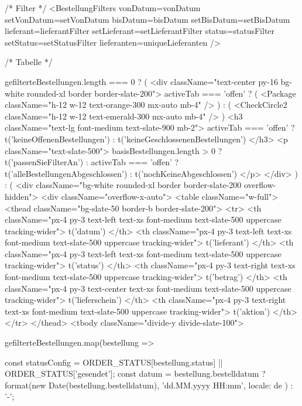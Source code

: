 {      {/* Filter */}
      <BestellungFilters
        vonDatum={vonDatum}
        setVonDatum={setVonDatum}
        bisDatum={bisDatum}
        setBisDatum={setBisDatum}
        lieferant={lieferantFilter}
        setLieferant={setLieferantFilter}
        status={statusFilter}
        setStatus={setStatusFilter}
        lieferanten={uniqueLieferanten}
      />

      {/* Tabelle */}
      {gefilterteBestellungen.length === 0 ? (
        <div className="text-center py-16 bg-white rounded-xl border border-slate-200">
          {activeTab === 'offen' ? (
            <Package className="h-12 w-12 text-orange-300 mx-auto mb-4" />
          ) : (
            <CheckCircle2 className="h-12 w-12 text-emerald-300 mx-auto mb-4" />
          )}
          <h3 className="text-lg font-medium text-slate-900 mb-2">
            {activeTab === 'offen' 
              ? t('keineOffenenBestellungen') 
              : t('keineGeschlossenenBestellungen')}
          </h3>
          <p className="text-slate-500">
            {basisBestellungen.length > 0 
              ? t('passenSieFilterAn')
              : activeTab === 'offen' 
                ? t('alleBestellungenAbgeschlossen')
                : t('nochKeineAbgeschlossen')}
          </p>
        </div>
      ) : (
        <div className="bg-white rounded-xl border border-slate-200 overflow-hidden">
          <div className="overflow-x-auto">
            <table className="w-full">
              <thead className="bg-slate-50 border-b border-slate-200">
                <tr>
                  <th className="px-4 py-3 text-left text-xs font-medium text-slate-500 uppercase tracking-wider">
                    {t('datum')}
                  </th>
                  <th className="px-4 py-3 text-left text-xs font-medium text-slate-500 uppercase tracking-wider">
                    {t('lieferant')}
                  </th>
                  <th className="px-4 py-3 text-left text-xs font-medium text-slate-500 uppercase tracking-wider">
                    {t('status')}
                  </th>
                  <th className="px-4 py-3 text-right text-xs font-medium text-slate-500 uppercase tracking-wider">
                    {t('betrag')}
                  </th>
                  <th className="px-4 py-3 text-center text-xs font-medium text-slate-500 uppercase tracking-wider">
                    {t('lieferschein')}
                  </th>
                  <th className="px-4 py-3 text-right text-xs font-medium text-slate-500 uppercase tracking-wider">
                    {t('aktion')}
                  </th>
                </tr>
              </thead>
              <tbody className="divide-y divide-slate-100">
                {gefilterteBestellungen.map(bestellung => {
                  const statusConfig = ORDER_STATUS[bestellung.status] || ORDER_STATUS['gesendet'];
                  const datum = bestellung.bestelldatum 
                    ? format(new Date(bestellung.bestelldatum), 'dd.MM.yyyy HH:mm', { locale: de })
                    : '-';

}}}}
